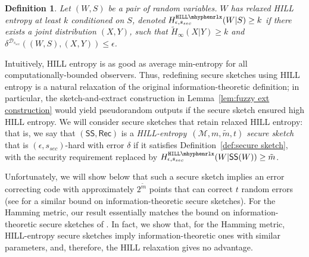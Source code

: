 \documentclass[11pt]{article}
\newcommand{\secref}[1]{\mbox{Section~\ref{#1}}}
\newcommand{\defref}[1]{\mbox{Definition~\ref{#1}}}
\newcommand{\lemref}[1]{\mbox{Lemma~\ref{#1}}}
\newcommand{\class}[1]{{\ensuremath{\mathsf{#1}}}}
\newcommand{\sketch}{\ensuremath{\class{SS}}\xspace}
\newcommand{\rec}{\ensuremath{\class{Rec}}\xspace}
\newcommand{\dis}{\ensuremath{\mathsf{dis}}}
\newcommand{\hill}{\ensuremath{\mathtt{HILL}}\xspace}
\newcommand{\hillrlx}{\ensuremath{\mathtt{HILL\mhyphen rlx}}\xspace}
\newtheorem{definition}[theorem]{Definition}
\newcommand{\authnote}[2]{{\textcolor{red}{\textsf{#1 notes: }\textcolor{blue}{ #2}}\marginpar{\textcolor{red}{\textbf{!!!!!}}}}}
\newcommand{\authnote}[2]{}
\newcommand{\lnote}[1]{{\authnote{Leo}{#1}}}
\begin{document}
\begin{definition}
\label{def:relaxed hill}
Let $(W, S)$ be a pair of random variables.  $W$ has 
\emph{relaxed HILL entropy} at least $k$ conditioned on $S$,
denoted $H^{\hillrlx}_{\epsilon, s_{sec}}(W|S)\geq k$ if there exists a joint distribution $(X, Y)$, such that $\tilde{H}_\infty(X|Y)\geq k$ and $\delta^{\mathcal{D}_{s_{sec}}} ((W, S),(X,Y))\leq \epsilon$.
\end{definition}


Intuitively, HILL entropy is as good as average min-entropy for all computationally-bounded observers.  Thus, redefining secure sketches using HILL entropy is a  natural relaxation of the original information-theoretic definition; in particular, the sketch-and-extract construction in \lemref{lem:fuzzy ext construction} would yield pseudorandom outputs if the secure sketch ensured high HILL entropy.  
We will consider secure sketches that retain relaxed HILL entropy: that is, we say that $(\sketch, \rec)$ is a  \emph{HILL-entropy~$(\mathcal{M}, m, \tilde{m}, t)$ secure sketch} that is $(\epsilon,s_{sec})$-hard with error $\delta$ if it satisfies \defref{def:secure sketch}, with the security requirement replaced by $H^{\hillrlx}_{\epsilon, s_{sec}}(W|\sketch(W))\geq \tilde{m}$. 

Unfortunately, we will show below that such a secure sketch implies an error correcting code with approximately $2^{\tilde{m}}$ points that can correct $t$ random errors (see  \cite[Lemma C.1]{DBLP:journals/siamcomp/DodisORS08} for a similar bound on information-theoretic secure sketches). For the Hamming metric, our result essentially matches the bound on information-theoretic secure sketches of \cite[Proposition 8.2]{DBLP:journals/siamcomp/DodisORS08}.  In fact, we show that, for the Hamming metric, HILL-entropy secure sketches imply information-theoretic ones with similar parameters, and, therefore, the HILL relaxation gives no advantage. 
\end{document}
